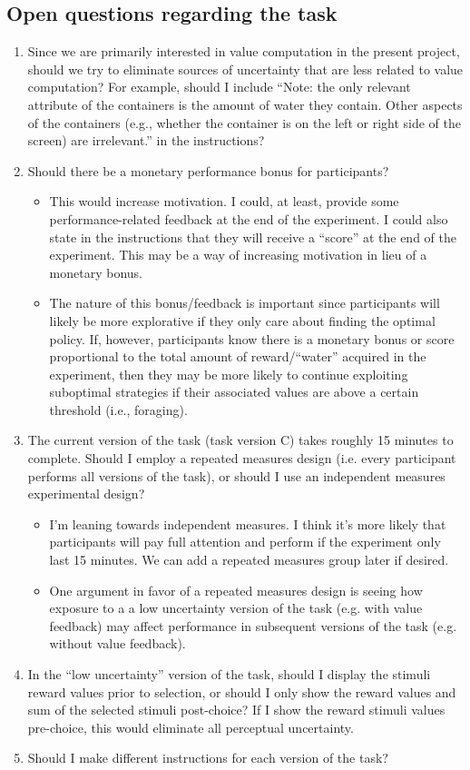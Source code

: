 \documentclass[11pt]{article}
\begin{document}
\subsection{Open questions regarding the task}
\label{sec:orgdec0582}
\begin{enumerate}
\item Since we are primarily interested in value computation in the present project, should we try to eliminate sources of uncertainty that are less related to value computation? For example, should I include ``Note: the only relevant attribute of the containers is the amount of water they contain. Other aspects of the containers (e.g., whether the container is on the left or right side of the screen) are irrelevant.'' in the instructions?
\item Should there be a monetary performance bonus for participants?
\begin{itemize}
\item This would increase motivation. I could, at least, provide some performance-related feedback at the end of the experiment. I could also state in the instructions that they will receive a ``score'' at the end of the experiment. This may be a way of increasing motivation in lieu of a monetary bonus.
\item The nature of this bonus/feedback is important since participants will likely be more explorative if they only care about finding the optimal policy. If, however, participants know there is a monetary bonus or score proportional to the total amount of reward/``water'' acquired in the experiment, then they may be more likely to continue exploiting suboptimal strategies if their associated values are above a certain threshold (i.e., foraging).
\end{itemize}
\item The current version of the task (task version C) takes roughly 15 minutes to complete. Should I employ a repeated measures design (i.e. every participant performs all versions of the task), or should I use an independent measures experimental design?
\begin{itemize}
\item I'm leaning towards independent measures. I think it's more likely that participants will pay full attention and perform if the experiment only last 15 minutes. We can add a repeated measures group later if desired.
\item One argument in favor of a repeated measures design is seeing how exposure to a a low uncertainty version of the task (e.g. with value feedback) may affect performance in subsequent versions of the task (e.g. without value feedback).
\end{itemize}
\item In the ``low uncertainty'' version of the task, should I display the stimuli reward values prior to selection, or should I only show the reward values and sum of the selected stimuli post-choice? If I show the reward stimuli values pre-choice, this would eliminate all perceptual uncertainty.
\item Should I make different instructions for each version of the task?
\end{enumerate}
\end{document}

